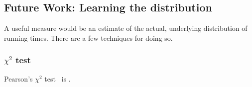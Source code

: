 \documentclass{article}
\begin{document}


\subsection{Future Work: Learning the distribution}

A useful measure would be an estimate of the actual, underlying distribution of running times.
There are a few techniques for doing so.

\subsubsection*{$\chi^2$ test}
Pearson's $\chi^2$ test~\cite{todo} is .
\end{document}
